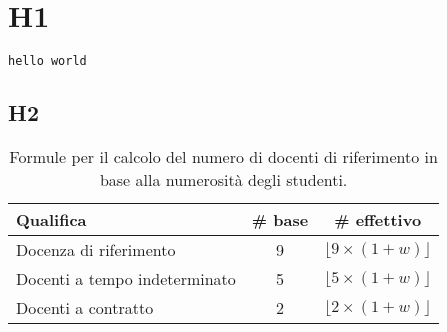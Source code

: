 \section{H1}\label{sec:h1}

\begin{lstlisting}[language=prolog, caption={Esempio}]    
 hello world

\end{lstlisting}


\subsection{H2}\label{sec:h2}

\begin{table}[h]
      \centering
      \renewcommand{\arraystretch}{1.5}
      \begin{tabular}{|l|c|c|}
      \hline
      \textbf{Qualifica} & \textbf{\# base} & \textbf{\# effettivo} \\
      \hline
      Docenza di riferimento & 9 & $\lfloor 9 \times (1+w) \rfloor$ \\
      \hline
      Docenti a tempo indeterminato & 5 & $\lfloor 5 \times (1+w) \rfloor$ \\
      \hline
      Docenti a contratto & 2 & $\lfloor 2 \times (1+w) \rfloor$ \\
      \hline
      \end{tabular}
      \caption{Formule per il calcolo del numero di docenti di riferimento in base alla numerosità degli studenti.}
      \label{tab:formula-w}
  \end{table}
